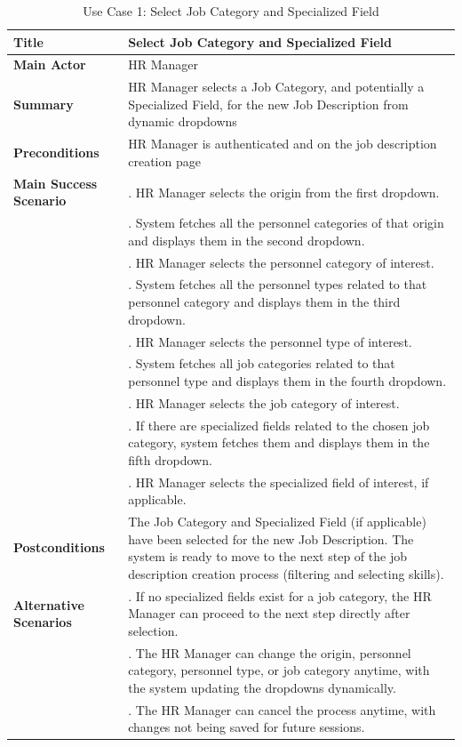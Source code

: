 \begin{table}[H]
    \renewcommand{\arraystretch}{1.5}%
    \caption{Use Case 1: Select Job Category and Specialized Field}
    \centering
    \medskip
    \small
    \begin{tabularx}{1.2\textwidth} {
            | >{\hsize=0.4\hsize\raggedright\arraybackslash}X
            | >{\hsize=1.6\hsize\raggedright\arraybackslash}X |}
        \hline
        \textbf{Title} & Select Job Category and Specialized Field \\
        \hline
        \textbf{Main Actor} & HR Manager \\
        \hline
        \textbf{Summary} & HR Manager selects a Job Category, and potentially a Specialized Field, for the new Job Description from dynamic dropdowns \\
        \hline
        \textbf{Preconditions} & HR Manager is authenticated and on the job description creation page \\
        \hline
        \textbf{Main Success Scenario} & 1. HR Manager selects the origin from the first dropdown. \\
        & 2. System fetches all the personnel categories of that origin and displays them in the second dropdown. \\
        & 3. HR Manager selects the personnel category of interest. \\
        & 4. System fetches all the personnel types related to that personnel category and displays them in the third dropdown. \\
        & 5. HR Manager selects the personnel type of interest. \\
        & 6. System fetches all job categories related to that personnel type and displays them in the fourth dropdown. \\
        & 7. HR Manager selects the job category of interest. \\
        & 8. If there are specialized fields related to the chosen job category, system fetches them and displays them in the fifth dropdown. \\
        & 9. HR Manager selects the specialized field of interest, if applicable. \\
        \hline
        \textbf{Postconditions} & The Job Category and Specialized Field (if applicable) have been selected for the new Job Description. The system is ready to move to the next step of the job description creation process (filtering and selecting skills). \\
        \hline
        \textbf{Alternative Scenarios} & 1. If no specialized fields exist for a job category, the HR Manager can proceed to the next step directly after selection.\\
        & 2. The HR Manager can change the origin, personnel category, personnel type, or job category anytime, with the system updating the dropdowns dynamically. \\
        & 3. The HR Manager can cancel the process anytime, with changes not being saved for future sessions. \\
        \hline
    \end{tabularx}
    \normalsize
\end{table}

